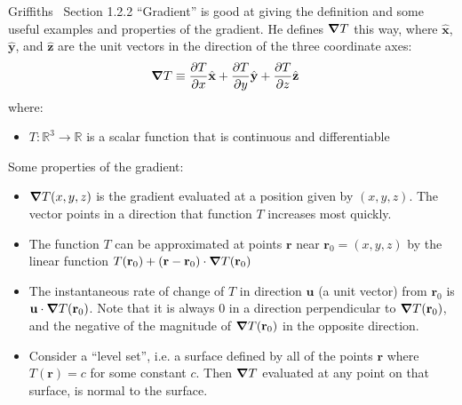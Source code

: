 \documentclass[a4paper]{article}
\theoremstyle{plain}
\theoremstyle{definition}
\newcommand{\vect}[1]{\textbf{#1}}
\newcommand{\hatvec}[1]{\hat{\textbf{#1}}}
\newcommand{\reals}{\mathbb{R}}
\begin{document}
Griffiths~\cite{Griffiths1998} Section 1.2.2 ``Gradient'' is good at
giving the definition and some useful examples and properties of the
gradient.  He defines $\grad T$ this way, where $\hatvec{x}$,
$\hatvec{y}$, and $\hatvec{z}$ are the unit vectors in the direction
of the three coordinate axes:
\begin{align*}
  \grad T & \equiv \frac{\partial T}{\partial x} \hatvec{x}
                 + \frac{\partial T}{\partial y} \hatvec{y}
                 + \frac{\partial T}{\partial z} \hatvec{z}
\end{align*}
where:
\begin{itemize}
  \item $T : \reals^3 \rightarrow \reals$ is a scalar function that is
    continuous and differentiable
\end{itemize}
Some properties of the gradient:
\begin{itemize}
  \item $\grad T(x, y, z)$ is the gradient evaluated at a position
    given by $(x, y, z)$.  The vector points in a direction that
    function $T$ increases most quickly.
  \item The function $T$ can be approximated at points $\vect{r}$ near
    $\vect{r}_0 = (x, y, z)$ by the linear function $T(\vect{r}_0) +
    (\vect{r} - \vect{r}_0) \cdot \grad T(\vect{r}_0)$
  \item The instantaneous rate of change of $T$ in direction
    $\vect{u}$ (a unit vector) from $\vect{r}_0$ is $\vect{u} \cdot
    \grad T(\vect{r}_0)$.  Note that it is always 0 in a direction
    perpendicular to $\grad T(\vect{r}_0)$, and the negative of the
    magnitude of $\grad T(\vect{r}_0)$ in the opposite direction.
  \item Consider a ``level set'', i.e. a surface defined by all of the
    points $\vect{r}$ where $T(\vect{r})=c$ for some constant $c$.
    Then $\grad T$ evaluated at any point on that surface, is normal
    to the surface.
\end{itemize}






	
\end{document}
